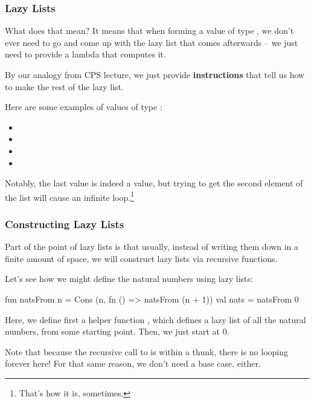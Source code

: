 \documentclass[aspectratio=169, handout]{beamer}
\begin{document}
\begin{frame}[fragile]
  \frametitle{Lazy Lists}

  What does that mean? It means that when forming a value of type ,
  we don't ever need to go and come up with the lazy list that comes afterwards --
  we just need to provide a lambda that computes it.

  \pause
  \vspace{\fill}

  By our analogy from CPS lecture, we just provide \textbf{instructions} that
  tell us how to make the rest of the lazy list.

  \pause
  \vspace{\fill}

  Here are some examples of values of type :
  \pause
  \begin{itemize}
    \item {} \pause
    \item {} \pause
    \item {} \pause
    \item {}
  \end{itemize}

  \pause
  \vspace{\fill}

  Notably, the last value is indeed a value, but trying to get the second
  element of the list will cause an infinite loop.\footnote{That's how it is, sometimes.}
\end{frame}

\begin{frame}[fragile]
  \frametitle{Constructing Lazy Lists}

  \rprs

  Part of the point of lazy lists is that usually, instead of writing them down
  in a finite amount of space, we will construct lazy lists via recursive functions.

  \pause
  \vspace{\fill}

  Let's see how we might define the natural numbers using lazy lists:
  \begin{codeblock}
    fun natsFrom n = Cons (n, fn () => natsFrom (n + 1))
    val nats = natsFrom 0
  \end{codeblock}

  \pause
  \vspace{\fill}

  Here, we define first a helper function , which defines a
  lazy list of all the natural numbers, from some starting point. Then, we just
  start at 0.

  \pause
  \vspace{\fill}

  Note that because the recursive call to  is within a thunk,
  there is no looping forever here! For that same reason, we don't need a base
  case, either.
\end{frame}
\end{document}
